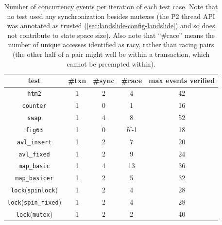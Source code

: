 \begin{table}[t]
	\begin{center}
		\small
		\begin{tabular}{c||c|c|c||c}
			{\bf test} & {\bf \#txn} & {\bf \#sync} & {\bf \#race} & {\bf max events verified} \\
			\hline
			{\tt htm2}		& 1	& 2	& 4	& 42	\\ %
			{\tt counter}		& 1	& 0	& 1	& 16	\\ %
			{\tt swap}		& 1	& 4	& 8	& 52	\\ %
			{\tt fig63}		& 1	& 0	& $K$-1	& 18	\\ %
			{\tt avl\_insert}	& 1	& 2	& 7	& 20	\\ %
			{\tt avl\_fixed}	& 1	& 2	& 9	& 24	\\ %
			{\tt map\_basic}	& 1	& 4	& 13	& 36	\\ %
			{\tt map\_basicer}	& 1	& 2	& 5	& 32	\\ %

			{\tt lock}({\tt spinlock})	& 1	& 2	& 4	& 28	\\ %
			{\tt lock}({\tt spin\_fixed})	& 1	& 2	& 4	& 28	\\ %
			{\tt lock}({\tt mutex})		& 1	& 2	& 2	& 40	\\ %
		\end{tabular}
	\end{center}
	\caption[Number of concurrency events per iteration of each test case.]
		{Number of concurrency events per iteration of each test case.
	Note that no test used any synchronization besides mutexes %
	(the P2 thread API was annotated as trusted (\cref{sec:landslide-config-landslide})
	and so does not contribute to state space size).
	Also note that ``\#race'' means the number of unique accesses identified as racy,
	rather than racing pairs
	(the other half of a pair might well be within a transaction, which cannot be preempted within).
	}
	\label{tab:tm-test-case-evence}
\end{table}

